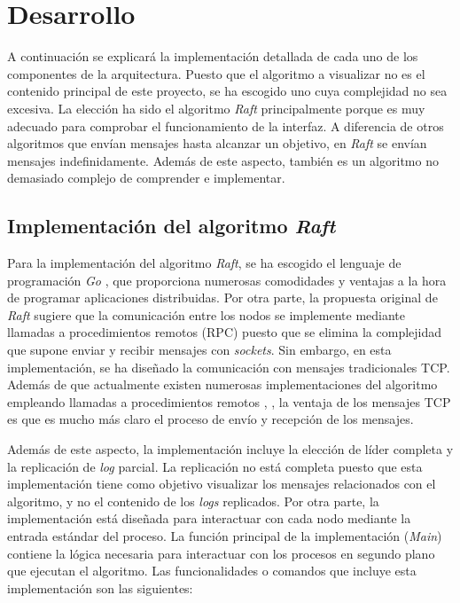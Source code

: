 \chapter{Desarrollo}

A continuación se explicará la implementación detallada de cada uno de los componentes de la arquitectura. Puesto que el algoritmo a visualizar no es el contenido principal de este proyecto, se ha escogido uno cuya complejidad no sea excesiva. La elección ha sido el algoritmo \textit{Raft} \cite{10.5555/2643634.2643666} principalmente porque es muy adecuado para comprobar el funcionamiento de la interfaz. A diferencia de otros algoritmos que envían mensajes hasta alcanzar un objetivo, en \textit{Raft} se envían mensajes indefinidamente. Además de este aspecto, también es un algoritmo no demasiado complejo de comprender e implementar.

\section{Implementación del algoritmo \textit{Raft}}
\label{sec:raft}

Para la implementación del algoritmo \textit{Raft}, se ha escogido el lenguaje de programación \textit{Go} \cite{go}, que proporciona numerosas comodidades y ventajas a la hora de programar aplicaciones distribuidas. Por otra parte, la propuesta original de \textit{Raft} \cite{raft1} sugiere que la comunicación entre los nodos se implemente mediante llamadas a procedimientos remotos (RPC) puesto que se elimina la complejidad que supone enviar y recibir mensajes con \textit{sockets}. Sin embargo, en esta implementación, se ha diseñado la comunicación con mensajes tradicionales TCP. Además de que actualmente existen numerosas implementaciones del algoritmo empleando llamadas a procedimientos remotos \cite{raftetcd}, \cite{rafteliben}, la ventaja de los mensajes TCP es que es mucho más claro el proceso de envío y recepción de los mensajes.

Además de este aspecto, la implementación incluye la elección de líder completa y la replicación de \textit{log} parcial. La replicación no está completa puesto que esta implementación tiene como objetivo visualizar los mensajes relacionados con el algoritmo, y no el contenido de los \textit{logs} replicados. Por otra parte, la implementación está diseñada para interactuar con cada nodo mediante la entrada estándar del proceso. La función principal de la implementación (\textit{Main}) contiene la lógica necesaria para interactuar con los procesos en segundo plano que ejecutan el algoritmo. Las funcionalidades o comandos que incluye esta implementación son las siguientes:

